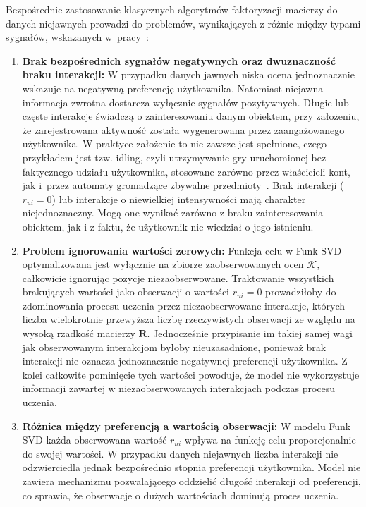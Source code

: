 Bezpośrednie zastosowanie klasycznych algorytmów faktoryzacji macierzy do danych niejawnych prowadzi do problemów, wynikających z różnic między typami sygnałów, wskazanych w~pracy~\cite{hu2008implicit}:

\begin{enumerate}
    \item \textbf{Brak bezpośrednich sygnałów negatywnych oraz dwuznaczność braku interakcji:} W przypadku danych jawnych niska ocena jednoznacznie wskazuje na negatywną preferencję użytkownika. Natomiast niejawna informacja zwrotna dostarcza wyłącznie sygnałów pozytywnych. Długie lub częste interakcje świadczą o zainteresowaniu danym obiektem, przy założeniu, że zarejestrowana aktywność została wygenerowana przez zaangażowanego użytkownika. W praktyce założenie to nie zawsze jest spełnione, czego przykładem jest tzw. idling, czyli utrzymywanie gry uruchomionej bez faktycznego udziału użytkownika, stosowane zarówno przez właścicieli kont, jak i~przez automaty gromadzące zbywalne przedmioty~\cite{grayson2019bots}. Brak interakcji ($r_{ui}=0$) lub interakcje o niewielkiej intensywności mają charakter niejednoznaczny. Mogą one wynikać zarówno z braku zainteresowania obiektem, jak i z faktu, że użytkownik nie wiedział o jego istnieniu.
    
    \item \textbf{Problem ignorowania wartości zerowych:} Funkcja celu w Funk SVD optymalizowana jest wyłącznie na zbiorze zaobserwowanych ocen $\mathcal{K}$, całkowicie ignorując pozycje niezaobserwowane. Traktowanie wszystkich brakujących wartości jako obserwacji o wartości $r_{ui}=0$ prowadziłoby do zdominowania procesu uczenia przez niezaobserwowane interakcje, których liczba wielokrotnie przewyższa liczbę rzeczywistych obserwacji ze względu na wysoką rzadkość macierzy $\mathbf{R}$. Jednocześnie przypisanie im takiej samej wagi jak obserwowanym interakcjom byłoby nieuzasadnione, ponieważ brak interakcji nie oznacza jednoznacznie negatywnej preferencji użytkownika. Z kolei całkowite pominięcie tych wartości powoduje, że model nie wykorzystuje informacji zawartej w niezaobserwowanych interakcjach podczas procesu uczenia.
    
    \item \textbf{Różnica między preferencją a wartością obserwacji:} W modelu Funk SVD każda obserwowana wartość $r_{ui}$ wpływa na funkcję celu proporcjonalnie do swojej wartości. W przypadku danych niejawnych liczba interakcji nie odzwierciedla jednak bezpośrednio stopnia preferencji użytkownika. Model nie zawiera mechanizmu pozwalającego oddzielić długość interakcji od preferencji, co sprawia, że obserwacje o dużych wartościach dominują proces uczenia.
\end{enumerate}

